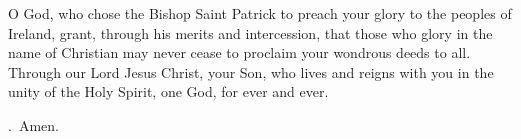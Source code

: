 \lettrine[lines=3]{O}{} God, who chose the Bishop Saint Patrick
to preach your glory to the peoples of Ireland,
grant, through his merits and intercession,
that those who glory in the name of Christian
may never cease to proclaim your wondrous deeds to all.
Through our Lord Jesus Christ, your Son,
who lives and reigns with you in the unity of the Holy Spirit,
one God, for ever and ever. \par \Rbar.~Amen.

